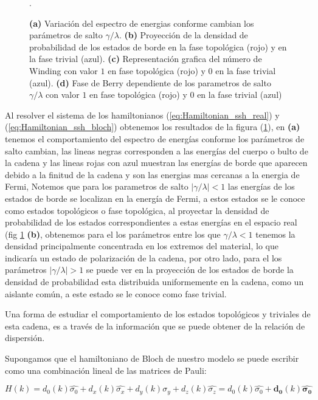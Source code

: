 \begin{figure}[h!]
\begin{subfigure}[b!]{0.27 \textwidth}
     \end{subfigure}
        \caption{\textbf{(a)} Variación del espectro de energias conforme cambian los parámetros de salto $\gamma/\lambda$. \textbf{(b)} Proyección de la densidad de probabilidad de los estados de borde en la fase topológica (rojo) y en la fase trivial (azul). \textbf{(c)} Representación grafica del número de Winding con valor $1$ en fase topológica (rojo) y $0$ en la fase trivial (azul). \textbf{(d)} Fase de Berry dependiente de los parametros de salto $\gamma/\lambda$ con valor $1$ en fase topológica (rojo) y $0$ en la fase trivial (azul)}.
        \label{fig:SSH_Img_Results}
\end{figure}

Al resolver el sistema de los hamiltonianos (\ref{eq:Hamiltonian_ssh_real}) y (\ref{eq:Hamiltonian_ssh_bloch}) obtenemos los resultados de la figura (\ref{fig:SSH_Img_Results}), en \textbf{(a)} tenemos el comportamiento del espectro de energías conforme los parámetros de salto cambian, las lineas negras corresponden a las energías del cuerpo o bulto de la cadena y las lineas rojas con azul muestran las energías de borde que aparecen debido a la finitud de la cadena y son las energias mas cercanas a la energia de Fermi, Notemos que para los parametros de salto $|\gamma/\lambda|<1$ las energías de los estados de borde se localizan en la energía de Fermi, a estos estados se le conoce como estados topológicos o fase topológica, al proyectar la densidad de probabilidad de los estados correspondientes a estas energías en el espacio real (fig \ref{fig:SSH_Img_Results} \textbf{(b)}, obtenemos para el los parámetros entre los que $\gamma/\lambda < 1$ tenemos la densidad principalmente concentrada en los extremos del material, lo que indicaría un estado de polarización de la cadena, por otro lado, para el los parámetros $|\gamma/\lambda| > 1$ se puede ver en la proyección de los estados de borde la densidad de probabilidad esta distribuida uniformemente en la cadena, como un aislante común, a este estado se le conoce como fase trivial.

Una forma de estudiar el comportamiento de los estados topológicos y triviales de esta cadena, es a través de la información que se puede obtener de la relación de dispersión. 

Supongamos que el hamiltoniano de Bloch de nuestro modelo se puede escribir como una combinación lineal de las matrices de Pauli:

\begin{equation}
    H(k) = d_0(k) \hat{\sigma_0} + d_x(k) \hat{\sigma_x} + d_y(k) \hat{\sigma_y} + d_z(k) \hat{\sigma_z} = d_0(k) \hat{\sigma_0} + \mathbf{d_0}(k) \mathbf{\hat{\sigma_0}}
\end{equation}

